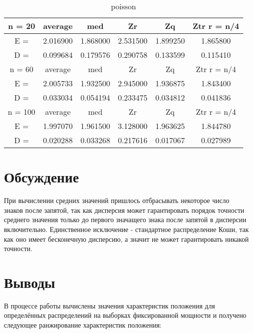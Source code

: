 \documentclass[12pt]{article}
\begin{document}
\begin{table}[H]
\caption{poisson}
\label{tab:my_label5}
\begin{center}
\vspace{5mm}
\begin{tabular}{|c|c|c|c|c|c|}
\hline
n = 20    &average     &med         &Zr          &Zq          &Ztr r = n/4 \\
\hline
E =       &2.016900    &1.868000    &2.531500    &1.899250    &1.865800    \\
\hline
D =       &0.099684    &0.179576    &0.290758    &0.133599    &0.115410    \\
\hline
n = 60    &average     &med         &Zr          &Zq          &Ztr r = n/4 \\
\hline
E =       &2.005733    &1.932500    &2.945000    &1.936875    &1.843400    \\
\hline
D =       &0.033034    &0.054194    &0.233475    &0.034812    &0.041836    \\
\hline
n = 100   &average     &med         &Zr          &Zq          &Ztr r = n/4 \\
\hline
E =       &1.997070    &1.961500    &3.128000    &1.963625    &1.844780    \\
\hline
D =       &0.020288    &0.033268    &0.217616    &0.017067    &0.027989    \\
\hline
\end{tabular}
\end{center}
\end{table}

\section{Обсуждение}

\par При вычислении средних значений пришлось отбрасывать некоторое число знаков после запятой, так как дисперсия может гарантировать порядок точности среднего значения только до первого значащего знака после запятой в дисперсии включительно. Единственное исключение - стандартное распределение Коши, так как оно имеет бесконечную дисперсию, а значит не может гарантировать никакой точности.

\section{Выводы}

\par В процессе работы вычислены значения характеристик положения для определённых распределений на выборках фиксированной мощности и получено следующее ранжирование характеристик положения:
\end{document}
